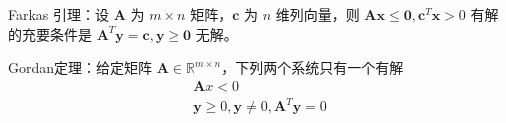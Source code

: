 

\newcommand\Title{最优化方法第3次作业}





\begin{remark}
    Farkas 引理：设 $\boldsymbol{A}$ 为 $m \times n$ 矩阵，$\boldsymbol{c}$ 为 $n$ 维列向量，则 $\boldsymbol{A}\boldsymbol{x}\le \boldsymbol{0},\boldsymbol{c}^T\boldsymbol{x} > 0$ 有解的充要条件是 $\boldsymbol{A}^T\boldsymbol{y} =\boldsymbol{c}, \boldsymbol{y} \ge \boldsymbol{0}$ 无解。
\end{remark}

\begin{remark} 
    Gordan定理：给定矩阵 $\boldsymbol{A} \in \mathbb{R}^{m\times n}$，下列两个系统只有一个有解
    \begin{gather*}
        \boldsymbol{A}x < 0\\
        \boldsymbol{y} \ge 0, \boldsymbol{y} \neq 0, \boldsymbol{A}^T\boldsymbol{y} = 0
    \end{gather*}
\end{remark}

